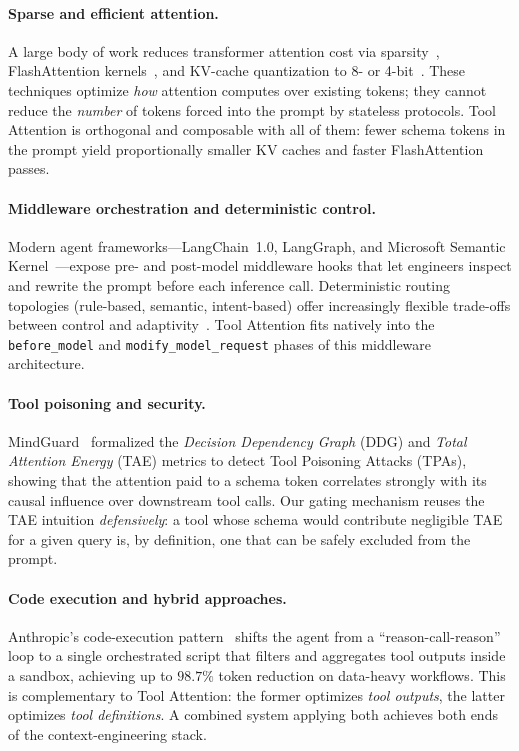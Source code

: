 \documentclass[11pt]{article}
\begin{document}
\paragraph{Sparse and efficient attention.} A large body of work reduces transformer attention cost via sparsity~\citep{child2019sparse}, FlashAttention kernels~\citep{dao2022flashattention}, and KV-cache quantization to 8- or 4-bit~\citep{redis2026contextwindows}. These techniques optimize \emph{how} attention computes over existing tokens; they cannot reduce the \emph{number} of tokens forced into the prompt by stateless protocols. Tool Attention is orthogonal and composable with all of them: fewer schema tokens in the prompt yield proportionally smaller KV caches and faster FlashAttention passes.

\paragraph{Middleware orchestration and deterministic control.} Modern agent frameworks---LangChain~1.0, LangGraph, and Microsoft Semantic Kernel~\citep{langchain2026middleware,microsoft2026semantickernel}---expose pre- and post-model middleware hooks that let engineers inspect and rewrite the prompt before each inference call. Deterministic routing topologies (rule-based, semantic, intent-based) offer increasingly flexible trade-offs between control and adaptivity~\citep{safe2026routing}. Tool Attention fits natively into the \texttt{before\_model} and \texttt{modify\_model\_request} phases of this middleware architecture.

\paragraph{Tool poisoning and security.} MindGuard~\citep{wang2025mindguard_v1,wang2026mindguard_v3} formalized the \emph{Decision Dependency Graph} (DDG) and \emph{Total Attention Energy} (TAE) metrics to detect Tool Poisoning Attacks (TPAs), showing that the attention paid to a schema token correlates strongly with its causal influence over downstream tool calls. Our gating mechanism reuses the TAE intuition \emph{defensively}: a tool whose schema would contribute negligible TAE for a given query is, by definition, one that can be safely excluded from the prompt.

\paragraph{Code execution and hybrid approaches.} Anthropic's code-execution pattern~\citep{kaplan2025codeexec} shifts the agent from a ``reason-call-reason'' loop to a single orchestrated script that filters and aggregates tool outputs inside a sandbox, achieving up to $98.7\%$ token reduction on data-heavy workflows. This is complementary to Tool Attention: the former optimizes \emph{tool outputs}, the latter optimizes \emph{tool definitions}. A combined system applying both achieves both ends of the context-engineering stack.
\end{document}
